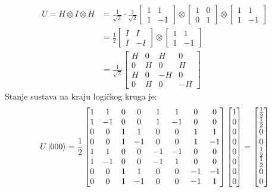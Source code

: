 \begin{equation}
\begin{aligned}
U = H \otimes I \otimes H &= \frac{1}{\sqrt{2}} \cdot \frac{1}{\sqrt{2}}
\begin{bmatrix} 1 & 1 \\ 1 & -1 \end{bmatrix} \otimes
\begin{bmatrix} 1 & 0 \\ 0 & 1 \end{bmatrix} \otimes
\begin{bmatrix} 1 & 1 \\ 1 & -1 \end{bmatrix} \\
&= \frac{1}{2}
\begin{bmatrix} I & I \\ I & -I \end{bmatrix} \otimes
\begin{bmatrix} 1 & 1 \\ 1 & -1 \end{bmatrix} \\
&= \frac{1}{\sqrt{2}} \begin{bmatrix} H & 0 & H & 0 \\ 0 & H & 0 & H \\ H & 0 & -H & 0 \\ 0 & H & 0 & -H \end{bmatrix}
\end{aligned}
\end{equation}
Stanje sustava na kraju logičkog kruga je:
\begin{equation}
U\ket{000} = \frac{1}{2}
\begin{bmatrix}
1 & 1 & 0 & 0 & 1 & 1 & 0 & 0 \\
1 & -1 & 0 & 0 & 1 & -1 & 0 & 0 \\
0 & 0 & 1 & 1 & 0 & 0 & 1 & 1 \\
0 & 0 & 1 & -1 & 0 & 0 & 1 & -1 \\
1 & 1 & 0 & 0 & -1 & -1 & 0 & 0 \\
1 & -1 & 0 & 0 & -1 & 1 & 0 & 0 \\
0 & 0 & 1 & 1 & 0 & 0 & -1 & -1 \\
0 & 0 & 1 & -1 & 0 & 0 & -1 & 1
\end{bmatrix}
\begin{bmatrix}
1 \\ 0 \\ 0 \\ 0 \\ 0 \\ 0 \\ 0 \\ 0 
\end{bmatrix}
= \begin{bmatrix}
\frac{1}{2} \\ \frac{1}{2} \\ 0 \\ 0 \\ \frac{1}{2} \\ \frac{1}{2} \\ 0 \\ 0 
\end{bmatrix}
\end{equation}
